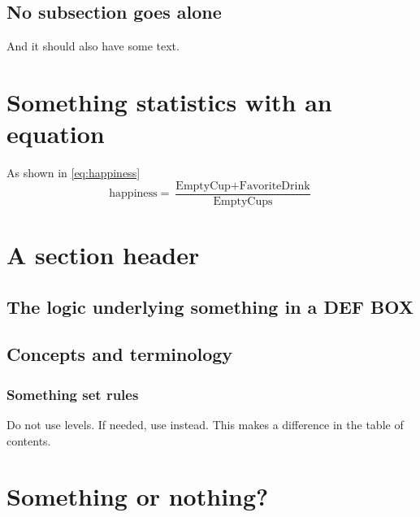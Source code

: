 \subsection{No subsection goes alone}
\label{subsec:somenoth}

And it should also have some text.


\section{Something statistics with an equation}
\label{sec:somestatistics}
	
As shown in \autoref{eq:happiness}
\begin{equation}\label{eq:happiness}
	\mbox{happiness}=\frac{\mbox{EmptyCup}+\mbox{FavoriteDrink}}{\mbox{EmptyCups}}
\end{equation}	
	
\section{A section header}
\label{sec:some-ref}
	
\subsection{The logic underlying something in a DEF BOX}
\label{subsec:logicunderlying}
    	
    	
\subsection{Concepts and terminology}
\label{subsec:conceptsterm}	
		
\subsubsection*{Something set rules} 

Do not use \inlinecode{\subsubsection} levels. If needed, use  \inlinecode{\subsubsection*} instead. This makes a difference in the table of contents.

\section{Something or nothing?}
\label{sec:someornot}

